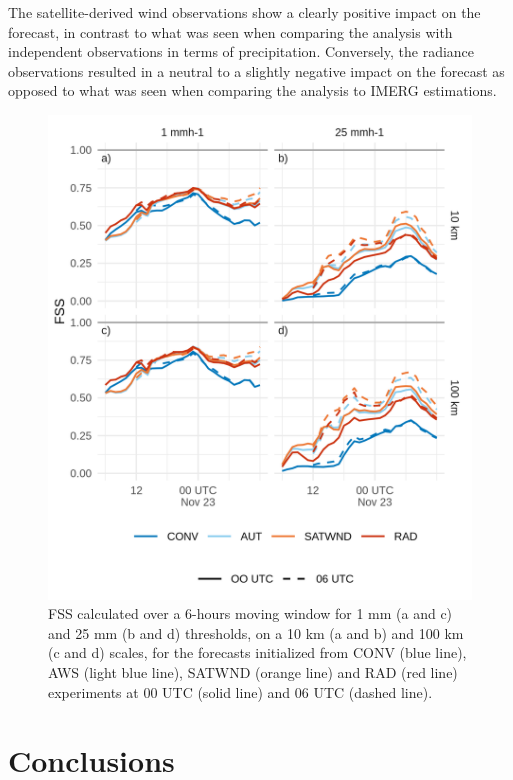 \documentclass[final,5p,times,twocolumn,authoryear]{elsarticle} %
\begin{document}
The satellite-derived wind observations show a clearly positive impact on the forecast, in contrast to what was seen when comparing the analysis with independent observations in terms of precipitation. Conversely, the radiance observations resulted in a neutral to a slightly negative impact on the forecast as opposed to what was seen when comparing the analysis to IMERG estimations.



\begin{figure}
\centering
\includegraphics{../figures/fssfcst-1.png}
\caption{\label{fig:fssfcst}FSS calculated over a 6-hours moving window for 1 mm (a and c) and 25 mm (b and d) thresholds, on a 10 km (a and b) and 100 km (c and d) scales, for the forecasts initialized from CONV (blue line), AWS (light blue line), SATWND (orange line) and RAD (red line) experiments at 00 UTC (solid line) and 06 UTC (dashed line).}
\end{figure}

\hypertarget{conclusions}{%
\section{Conclusions}\label{conclusions}}
\end{document}
